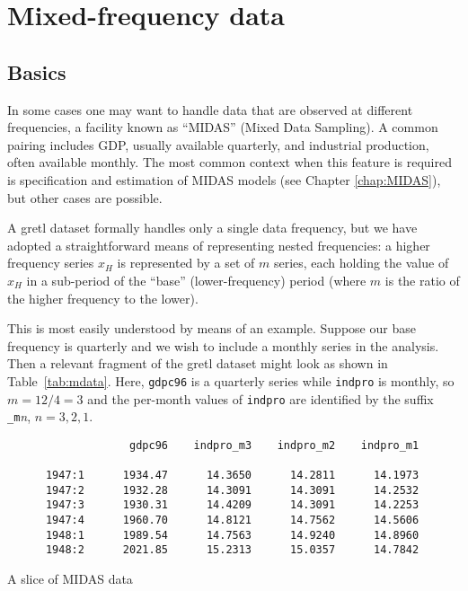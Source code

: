 \chapter{Mixed-frequency data}
\label{chap:mixed-frequency}

\section{Basics}
\label{sec:mixed-basics}

In some cases one may want to handle data that are observed at
different frequencies, a facility known as ``MIDAS'' (Mixed Data
Sampling). A common pairing includes GDP, usually available quarterly,
and industrial production, often available monthly. The most common
context when this feature is required is specification and estimation
of MIDAS models (see Chapter \ref{chap:MIDAS}), but other cases are
possible.

A gretl dataset formally handles only a single data frequency, but we
have adopted a straightforward means of representing nested
frequencies: a higher frequency series $x_H$ is represented by a set
of $m$ series, each holding the value of $x_H$ in a sub-period of the
``base'' (lower-frequency) period (where $m$ is the ratio of the
higher frequency to the lower).

This is most easily understood by means of an example. Suppose our
base frequency is quarterly and we wish to include a monthly series in
the analysis. Then a relevant fragment of the gretl dataset might look
as shown in Table~\ref{tab:mdata}. Here, \texttt{gdpc96} is a
quarterly series while \texttt{indpro} is monthly, so $m=12/4=3$ and
the per-month values of \texttt{indpro} are identified by the suffix
\verb|_m|\textit{n}, $n=3,2,1$.

\begin{table}[h]
\small
\begin{verbatim}
                   gdpc96    indpro_m3    indpro_m2    indpro_m1

      1947:1      1934.47      14.3650      14.2811      14.1973
      1947:2      1932.28      14.3091      14.3091      14.2532
      1947:3      1930.31      14.4209      14.3091      14.2253
      1947:4      1960.70      14.8121      14.7562      14.5606
      1948:1      1989.54      14.7563      14.9240      14.8960
      1948:2      2021.85      15.2313      15.0357      14.7842
\end{verbatim}
  \caption{A slice of MIDAS data}
  \label{tab:mdata}
\end{table}

